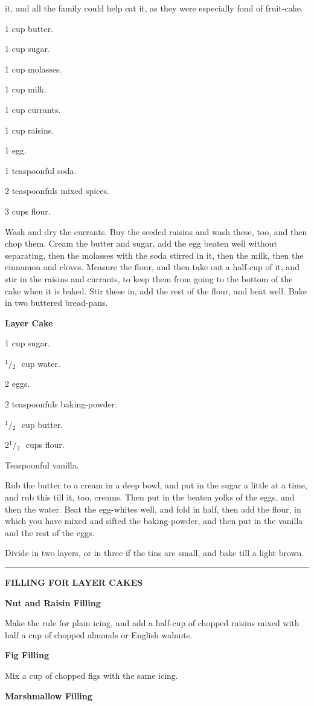 \documentclass[11pt]{book}
\newcommand{\hstroke}{\rule[0.5ex]{5.0em}{0.2ex}}
\newcommand{\indpar}{\par\noindent\hspace*{\parindent}}
\newcommand{\ingredient}{\indpar}
\newcommand{\instruction}{\indpar}
\newcommand{\OneHalf}{\ensuremath{{}^1\!\!/\!{}_2\mbox{\ }}}
\newenvironment{RecipeTitle}{\medskip\begin{center}\large\bf }{\end{center}\smallskip}
\newenvironment{FoodTypeTitle}{\begin{center}\large\bf }{\end{center}}
\begin{document}
it, and all the family could help eat it, as they were
especially fond of fruit-cake.
\ingredient  1 cup butter.
\ingredient  1 cup sugar.
\ingredient  1 cup molasses.
\ingredient  1 cup milk.
\ingredient  1 cup currants.
\ingredient  1 cup raisins.
\ingredient  1 egg.
\ingredient  1 teaspoonful soda.
\ingredient  2 teaspoonfuls mixed spices.
\ingredient  3 cups flour.
\instruction  Wash and dry the currants.  Buy the seeded raisins and wash
these, too, and then chop them.  Cream the butter and sugar,
add the egg beaten well without separating, then the molasses
with the soda stirred in it, then the milk, then the cinnamon
and cloves.  Measure the flour, and then take out a half-cup
of it, and stir in the raisins and currants, to keep them from
going to the bottom of the cake when it is baked.  Stir these
in, add the rest of the flour, and beat well.  Bake in two
buttered bread-pans.
\begin{RecipeTitle}
Layer Cake\label{layer_cake}
\end{RecipeTitle}
\ingredient  1 cup sugar.
\ingredient  \OneHalf cup water.
\ingredient  2 eggs.
\ingredient  2 teaspoonfuls baking-powder.
\ingredient  \OneHalf cup butter.
\ingredient  2\OneHalf cups flour.
\ingredient  Teaspoonful vanilla.
\instruction  Rub the butter to a cream in a deep bowl, and put in the
sugar a little at a time, and rub this till it, too, creams.
Then put in the beaten yolks of the eggs, and then the water.
Beat the egg-whites well, and fold in half, then add the
flour, in which you have mixed and sifted the baking-powder,
and then put in the vanilla and the rest of the eggs.
\instruction  Divide in two layers, or in three if the tins are small, and
bake till a light brown.
\begin{center}
\hstroke
\end{center}\pagebreak[4]
\begin{FoodTypeTitle}
FILLING FOR LAYER CAKES\label{CAKE_FILLING}
\end{FoodTypeTitle}
\begin{RecipeTitle}
Nut and Raisin Filling\label{nut_and_raisin_filling}
\end{RecipeTitle}
\instruction  Make the rule for plain icing, and add a half-cup of chopped
raisins mixed with half a cup of chopped almonds or English
walnuts.
\begin{RecipeTitle}
Fig Filling\label{fig_filling}
\end{RecipeTitle}
\instruction  Mix a cup of chopped figs with the same icing.
\begin{RecipeTitle}
Marshmallow Filling\label{marshmallow_filling}
\end{RecipeTitle}
\end{document}

